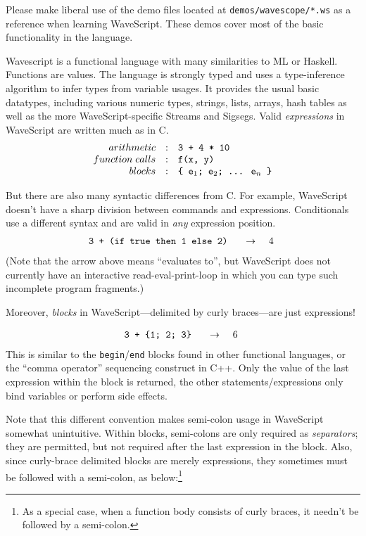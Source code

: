 \documentclass[twocolumn]{report}
\newcommand{\evalsto}[2]{\[ \begin{array}{rcl}
$\tt #1 $&$ \arr $&$ #2 $
\end{array} \]}
\newcommand{\arr}{\ensuremath{\rightarrow}}
\newcommand{\ws}{WaveScript}
\begin{document}
Please make liberal use of the demo files located at {\tt demos/wavescope/*.ws} as a reference
when learning WaveScript.  These demos cover most of the basic
functionality in the language.


Wavescript is a functional language with many similarities to ML or
Haskell.  Functions are values.  The language is strongly typed and uses a
type-inference algorithm to infer types from variable usages.
It provides the usual basic datatypes, including various
numeric types, strings, lists, arrays, hash tables as well as the more
WaveScript-specific Streams and Sigsegs.  Valid {\em expressions} in
WaveScript are written much as in C.
\[
\begin{array}{rcl}
arithmetic       & : & $\tt 3 + 4 * 10 $  \\
function\; calls & : & $\tt f(x, y)$  \\
blocks           & : & $\tt \{ e$_1$; e$_2$; \ldots$\:$ e$_n$ \}$  \\
\end{array}
\]

But there are also many syntactic differences from C.  For example,
WaveScript doesn't have a sharp division between commands and
expressions.  Conditionals use a different syntax and are valid in
{\em any}
expression position.
%
\evalsto{3 + (if true then 1 else 2)} {4}
%
(Note that the arrow above means ``evaluates to'', but {\ws} does not
currently have an interactive read-eval-print-loop in which you can
type such incomplete program fragments.)

Moreover, {\em blocks} in WaveScript---delimited by curly
braces---are just expressions!

\evalsto{3 + \{1; 2; 3\}} {6}
%
This is similar to the {\tt begin}/{\tt end} blocks found in other
functional languages, or the ``comma operator'' sequencing construct
in C++.  Only the value of the last expression within the block is
returned, the other statements/expressions only bind variables or
perform side effects.

Note that this different convention makes semi-colon usage in
WaveScript somewhat unintuitive.  Within blocks, semi-colons are only
required as {\em separators}; they are permitted, but not required
after the last expression in the block.  Also, since curly-brace
delimited blocks are merely expressions, they sometimes must be
followed with a semi-colon, as below:\footnote{As a special case, when
a function body consists of curly braces, it needn't be followed by a semi-colon.}
\end{document}
